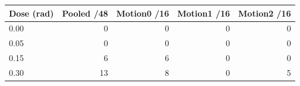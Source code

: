 \begin{tabular}{lrrrr}
\toprule
Dose (rad) & Pooled /48 & Motion0 /16 & Motion1 /16 & Motion2 /16\\
\midrule
0.00 & 0 & 0 & 0 & 0\\
0.05 & 0 & 0 & 0 & 0\\
0.15 & 6 & 6 & 0 & 0\\
0.30 & 13 & 8 & 0 & 5\\
\bottomrule
\end{tabular}
